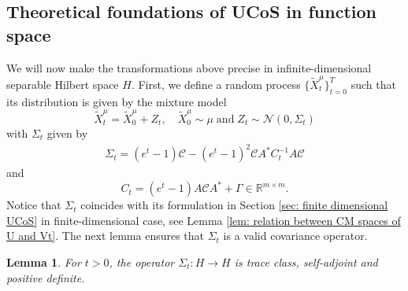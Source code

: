 \documentclass[10pt]{article} %
\newcommand{\R}{\mathbb{R}}
\theoremstyle{plain}
\newtheorem{lemma}[theorem]{Lemma}
\theoremstyle{definition}
\theoremstyle{remark}
\newcommand{\C}{\mathcal C}
\newcommand{\N}{\mathcal N}
\newcommand{\fabian}[1]{{#1}}%
\begin{document}
\subsection{Theoretical foundations of UCoS in function space}
We will now make the transformations above precise in infinite-dimensional separable Hilbert space $H$. First, we define a random process $\{\widetilde{X}^{\mu}_t\}_{t=0}^T$ such that its distribution is given by the mixture model
\begin{equation}\label{eq: adapted forward model}
    \widetilde X^{\mu}_t = \widetilde X^{\mu}_0 + Z_t, \quad \widetilde X^{\mu}_0 \sim \mu \; \text{and} \; Z_t \sim \N(0, \Sigma_t)
\end{equation}
with $\Sigma_t$ given  by
\begin{eqnarray}\label{eq: formal definition of Sigma_t}
   \Sigma_t = (e^t -1)\C - (e^t-1)^2\C A^* C_t^{-1} A \C
\end{eqnarray}
and
\begin{equation}
    \label{eq:Ct}
	C_t = (e^{t}-1) A \C A^* + \Gamma \in \R^{m \times m}.
\end{equation}
\fabian{Notice that $\Sigma_t$ coincides with its formulation in Section \ref{sec: finite dimensional UCoS} in finite-dimensional case, see Lemma \ref{lem: relation between CM spaces of U and Vt}.}
The next lemma ensures that $\Sigma_t$ is a valid covariance operator.
\begin{lemma}\label{lem: Sigma_t is covariance operator}
For $t>0$, the operator $\Sigma_t : H \to H$ is trace class, self-adjoint and positive definite.
\end{lemma}
\end{document}
